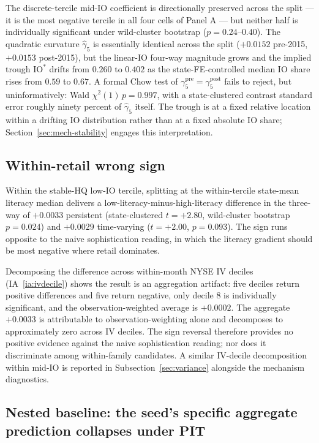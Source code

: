 The discrete-tercile mid-IO coefficient is directionally preserved across the split --- it is the most negative tercile in all four cells of Panel A --- but neither half is individually significant under wild-cluster bootstrap ($p = 0.24$--$0.40$). The quadratic curvature $\hat\gamma_{5}$ is essentially identical across the split ($+0.0152$ pre-2015, $+0.0153$ post-2015), but the linear-IO four-way magnitude grows and the implied trough $\mathrm{IO}^{\ast}$ drifts from $0.260$ to $0.402$ as the state-FE-controlled median IO share rises from $0.59$ to $0.67$. A formal Chow test of $\gamma_{5}^{\text{pre}} = \gamma_{5}^{\text{post}}$ fails to reject, but uninformatively: Wald $\chi^{2}(1)\,p = 0.997$, with a state-clustered contrast standard error roughly ninety percent of $\hat\gamma_{5}$ itself. The trough is at a fixed relative location within a drifting IO distribution rather than at a fixed absolute IO share; Section~\ref{sec:mech-stability} engages this interpretation.

\subsection{Within-retail wrong sign}
\label{sec:withinretail}

Within the stable-HQ low-IO tercile, splitting at the within-tercile state-mean literacy median delivers a low-literacy-minus-high-literacy difference in the three-way of $+0.0033$ persistent (state-clustered $t = +2.80$, wild-cluster bootstrap $p = 0.024$) and $+0.0029$ time-varying ($t = +2.00$, $p = 0.093$). The sign runs opposite to the naive sophistication reading, in which the literacy gradient should be most negative where retail dominates.

Decomposing the difference across within-month NYSE IV deciles (IA~\ref{ia:ivdecile}) shows the result is an aggregation artifact: five deciles return positive differences and five return negative, only decile 8 is individually significant, and the observation-weighted average is $+0.0002$. The aggregate $+0.0033$ is attributable to observation-weighting alone and decomposes to approximately zero across IV deciles. The sign reversal therefore provides no positive evidence against the naive sophistication reading; nor does it discriminate among within-family candidates. A similar IV-decile decomposition within mid-IO is reported in Subsection~\ref{sec:variance} alongside the mechanism diagnostics.

\subsection{Nested baseline: the seed's specific aggregate prediction collapses under PIT}
\label{sec:nestedbaseline}

